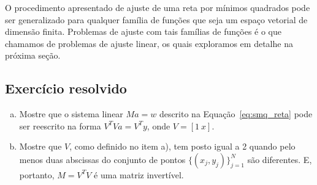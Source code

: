 O procedimento apresentado de ajuste de uma reta por mínimos quadrados pode ser generalizado para qualquer família de funções que seja um espaço vetorial de dimensão finita. Problemas de ajuste com tais famílias de funções é o que chamamos de problemas de ajuste linear, os quais exploramos em detalhe na próxima seção.

\subsection*{Exercício resolvido}

\begin{exeresol}\label{exer:smq_reta}
  \begin{enumerate}[a)]
  \item Mostre que o sistema linear $Ma = w$ descrito na Equação~\ref{eq:smq_reta} pode ser reescrito na forma $V^TVa = V^Ty$, onde $V = [1~x]$.
  \item Mostre que $V$, como definido no item a), tem posto igual a 2 quando pelo menos duas abscissas do conjunto de pontos $\{(x_j, y_j)\}_{j=1}^N$ são diferentes. E, portanto, $M = V^TV$ é uma matriz invertível.
  \end{enumerate}
\end{exeresol}
